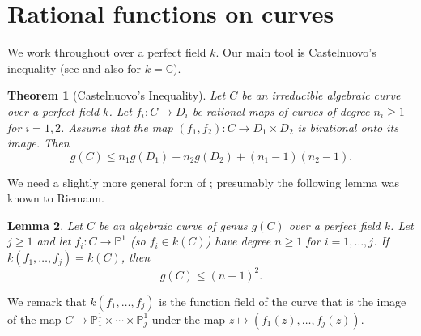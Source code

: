 \documentclass[11pt]{amsart}
\newtheorem{theorem}{Theorem}[section]
\newtheorem{lemma}[theorem]{Lemma}
\theoremstyle{definition}
\numberwithin{equation}{section}
\newcommand{\Cb}{\mathbb{C}}
\newcommand{\Pb}{\mathbb{P}}
\begin{document}
\section{Rational functions on curves}
We work throughout over a perfect field $k$. Our main tool is Castelnuovo's inequality (see \cite[Theorem 3.11.3]{Stichtenoth} and also \cite[Proposition 1]{Accola} for $k=\Cb$).

\begin{theorem}[Castelnuovo's Inequality]
	Let $C$ be an irreducible algebraic curve over a perfect field $k$. Let $f_i\colon C\to D_i$ be rational maps of curves of degree $n_i\geq 1$ for $i=1,2$.  Assume that the map $(f_1,f_2)\colon C\to D_1\times D_2$ is birational onto its image. 	Then
	\[
		g(C)\le n_1g(D_1)+n_2g(D_2)+(n_1-1)(n_2-1).
	\]
\end{theorem}


We need a slightly more general form of \cite[Corollary 3.11.4]{Stichtenoth}; presumably the following lemma was known to Riemann.

\begin{lemma}\label{l:castn}
	Let $C$ be an algebraic curve of genus $g(C)$ over a perfect field $k$. Let $j\geq 1$ and let $f_i\colon C\to \Pb^1$ (so $f_i\in k(C)$) have degree $n\geq 1$ for $i=1,\ldots,j$.   If $k(f_1,\ldots,f_j)=k(C)$, then 
	\[
		g(C)\le (n-1)^2.
	\]
\end{lemma}
\noindent 
We remark that $k(f_1,\ldots,f_j)$ is the function field of the curve that is the image of the map $C\to \Pb^1_1\times\cdots\times\Pb^1_j$ under the map $z\mapsto (f_1(z),\ldots ,f_j(z))$.
\end{document}
